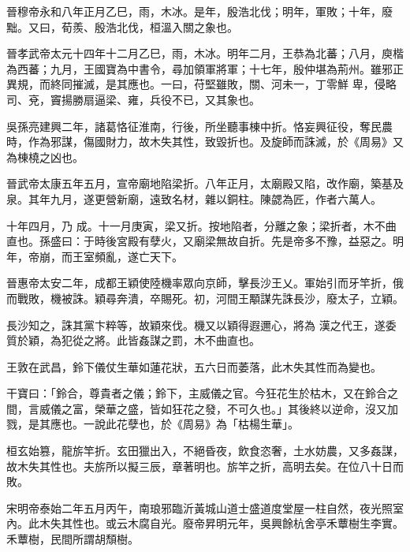 \begin{pinyinscope}
 晉穆帝永和八年正月乙巳，雨，木冰。是年，殷浩北伐；明年，軍敗；十年，廢黜。又曰，荀羨、殷浩北伐，桓溫入關之象也。



 晉孝武帝太元十四年十二月乙巳，雨，木冰。明年二月，王恭為北蕃；八月，庾楷為西蕃；九月，王國寶為中書令，尋加領軍將軍；十七年，殷仲堪為荊州。雖邪正異規，而終同摧滅，是其應也。一曰，苻堅雖敗，關、河未一，丁零鮮
 卑，侵略司、兗，竇揚勝扇逼梁、雍，兵役不已，又其象也。



 吳孫亮建興二年，諸葛恪征淮南，行後，所坐聽事棟中折。恪妄興征役，奪民農時，作為邪謀，傷國財力，故木失其性，致毀折也。及旋師而誅滅，於《周易》又為棟橈之凶也。



 晉武帝太康五年五月，宣帝廟地陷梁折。八年正月，太廟殿又陷，改作廟，築基及泉。其年九月，遂更營新廟，遠致名材，雜以銅柱。陳勰為匠，作者六萬人。



 十年四月，乃
 成。十一月庚寅，梁又折。按地陷者，分離之象；梁折者，木不曲直也。孫盛曰：于時後宮殿有孽火，又廟梁無故自折。先是帝多不豫，益惡之。明年，帝崩，而王室頻亂，遂亡天下。



 晉惠帝太安二年，成都王穎使陸機率眾向京師，擊長沙王乂。軍始引而牙竿折，俄而戰敗，機被誅。穎尋奔潰，卒賜死。初，河間王顒謀先誅長沙，廢太子，立穎。



 長沙知之，誅其黨卞粹等，故穎來伐。機又以穎得遐邇心，將為
 漢之代王，遂委質於穎，為犯從之將。此皆姦謀之罰，木不曲直也。



 王敦在武昌，鈴下儀仗生華如蓮花狀，五六日而萎落，此木失其性而為變也。



 干寶曰：「鈴合，尊貴者之儀；鈴下，主威儀之官。今狂花生於枯木，又在鈴合之間，言威儀之富，榮華之盛，皆如狂花之發，不可久也。」其後終以逆命，沒又加戮，是其應也。一說此花孽也，於《周易》為「枯楊生華」。



 桓玄始篡，龍旂竿折。玄田獵出入，不絕昏夜，飲食恣奢，土水妨農，又多姦謀，故木失其性也。夫旂所以擬三辰，章著明也。旂竿之折，高明去矣。在位八十日而敗。



 宋明帝泰始二年五月丙午，南琅邪臨沂黃城山道士盛道度堂屋一柱自然，夜光照室內。此木失其性也。或云木腐自光。廢帝昇明元年，吳興餘杭舍亭禾蕈樹生李實。禾蕈樹，民間所謂胡頹樹。




\end{pinyinscope}
